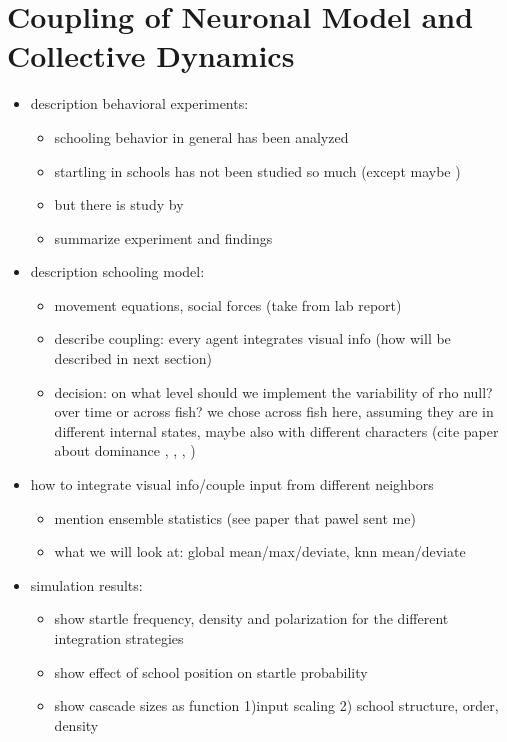 \documentclass[a4paper,10pt,hidelinks]{scrreprt}
\begin{document}
	\chapter{Coupling of Neuronal Model and Collective Dynamics}
	\begin{itemize}
		\item description behavioral experiments:
		\begin{itemize}
			\item schooling behavior in general has been analyzed
			\item startling in schools has not been studied so much (except maybe 
			\cite{Fischer2015})
			\item but there is study by \cite{Rosenthal2015}
			\item summarize experiment and findings
		\end{itemize}
		\item description schooling model:
		\begin{itemize}
			\item movement equations, social forces (take from lab report)
			\item describe coupling: every agent integrates visual info (how will be described in 
			next section)
			\item decision: on what level should we implement the variability of rho null? over 
			time or across fish? we chose across fish here, assuming they are in different internal 
			states, maybe also with different characters (cite paper about dominance 
			\cite{Khan2017}, \cite{Miller2017}, \cite{Neumeister2010}, \cite{Park2018})
		\end{itemize}
		\item how to integrate visual info/couple input from different neighbors
		\begin{itemize}
			\item mention ensemble statistics (see paper that pawel sent me)
			\item what we will look at: global mean/max/deviate, knn mean/deviate
		\end{itemize}
		\item simulation results:
		\begin{itemize}
			\item show startle frequency, density and polarization for the different integration 
			strategies
			\item show effect of school position on startle probability
			\item show cascade sizes as function 1)input scaling 2) school structure, order, density
			
		\end{itemize}
	\end{itemize}
\end{document}
